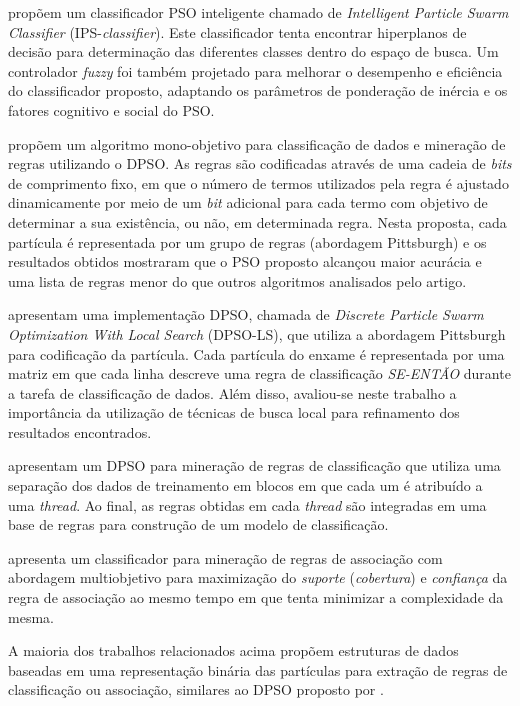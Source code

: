 \documentclass[
	12pt,				%
	openany,			%
	oneside,	
	a4paper,			%
	brazil,				%
	]{unimontes-ppgmsc-abntex2}
\begin{document}
 propõem um classificador PSO inteligente chamado de {\em Intelligent Particle Swarm Classifier} (IPS-{\em classifier}). Este classificador tenta encontrar hiperplanos de decisão para determinação das diferentes classes dentro do espaço de busca. Um controlador {\em fuzzy} foi também projetado para melhorar o desempenho e eficiência do classificador proposto, adaptando os parâmetros de ponderação de inércia e os fatores cognitivo e social do PSO. 

 propõem um algoritmo mono-objetivo para classificação de dados e mineração de regras utilizando o DPSO. As regras são codificadas através de uma cadeia de {\em bits} de comprimento fixo, em que o número de termos utilizados pela regra é ajustado dinamicamente por meio de um {\em bit} adicional para cada termo com objetivo de determinar a sua existência, ou não, em determinada regra. Nesta proposta, cada partícula é representada por um grupo de regras (abordagem Pittsburgh) e os resultados obtidos mostraram que o PSO proposto alcançou maior acurácia e uma lista de regras menor do que outros algoritmos analisados pelo artigo.

 apresentam uma implementação DPSO, chamada de {\em Discrete Particle Swarm Optimization With Local Search} (DPSO-LS), que utiliza a abordagem Pittsburgh para codificação da partícula. Cada partícula do enxame é representada por uma matriz em que cada linha descreve uma regra de classificação {\em SE-ENTÃO} durante a tarefa de classificação de dados. Além disso, avaliou-se neste trabalho a importância da utilização de técnicas de busca local para refinamento dos resultados encontrados.

 apresentam um DPSO para mineração de regras de classificação que utiliza uma separação dos dados de treinamento em blocos em que cada um é atribuído a uma {\em thread}. Ao final, as regras obtidas em cada {\em thread} são integradas em uma base de regras para construção de um modelo de classificação.

 apresenta um classificador para mineração de regras de associação com abordagem multiobjetivo para maximização do {\em suporte} ({\em cobertura}) e {\em confiança} da regra de associação ao mesmo tempo em que tenta minimizar a complexidade da mesma.

A maioria dos trabalhos relacionados acima propõem estruturas de dados baseadas em uma representação binária das partículas para extração de regras de classificação ou associação, similares ao DPSO proposto por . 
\end{document}
